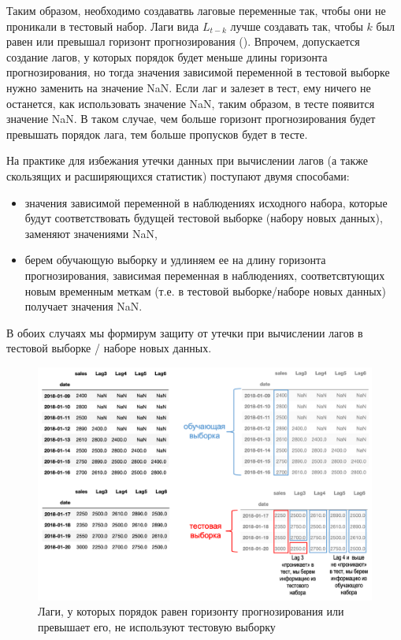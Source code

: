 \documentclass[%
	11pt,
	a4paper,
	utf8,
		]{article}
\begin{document}
Таким образом, необходимо создаватвь лаговые переменные так, чтобы они не проникали в тестовый набор. Лаги вида $ L_{t-k} $ лучше создавать так, чтобы $ k $ был равен или превышал горизонт прогнозирования (). Впрочем, допускается создание лагов, у которых порядок будет меньше длины горизонта прогнозирования, но тогда значения зависимой переменной в тестовой выборке нужно заменить на значение NaN. Если лаг и залезет в тест, ему ничего не останется, как использовать значение NaN, таким образом, в тесте появится значение NaN. В таком случае, чем больше горизонт прогнозирования будет превышать порядок лага, тем больше пропусков будет в тесте.

На практике для избежания утечки данных при вычислении лагов (а также скользящих и расширяющихся статистик) поступают двумя способами:
\begin{itemize}
	\item значения зависимой переменной в наблюдениях исходного набора, которые будут соответствовать будущей тестовой выборке (набору новых данных), заменяют значениями NaN,
	
	\item берем обучающую выборку и удлиняем ее на длину горизонта прогнозирования, зависимая переменная в наблюдениях, соответсвтующих новым временным меткам (т.е. в тестовой выборке/наборе новых данных) получает значения NaN.
\end{itemize}

В обоих случаях мы формирум защиту от утечки при вычислении лагов в тестовой выборке / наборе новых данных.

\begin{figure}[h]
	\centering
	\includegraphics[scale=0.4]{figures/lags.png}
	\caption{ Лаги, у которых порядок равен горизонту прогнозирования или превышает его, не используют тестовую выборку }\label{fig:lags}
\end{figure}
\end{document}
